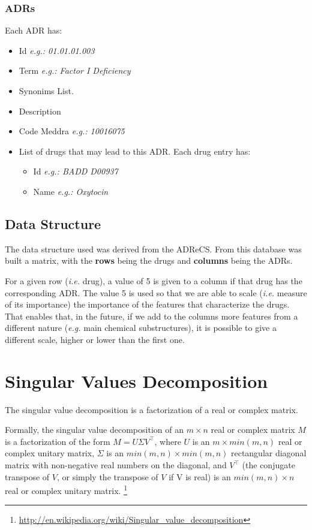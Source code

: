 \documentclass{llncs}
\begin{document}
\subsubsection{ADRs}

Each ADR has:
\begin{itemize}
\item Id \emph{e.g.: 01.01.01.003}
\item Term \emph{e.g.: Factor I Deficiency}
\item Synonims List.
\item Description
\item Code Meddra \emph{e.g.: 10016075}
\item List of drugs that may lead to this ADR. Each drug entry has:
	\begin{itemize}
	\item Id \emph{e.g.: BADD D00937}
	\item Name \emph{e.g.: Oxytocin}
	\end{itemize}
\end{itemize}

\subsection{Data Structure}
The data structure used was derived from the ADReCS. From this database was built a matrix, with the \textbf{rows} being the drugs and \textbf{columns} being the ADRs.

For a given row (\emph{i.e.} drug), a value of 5 is given to a column if that drug has the corresponding ADR. 
The value 5 is used so that we are able to scale (\emph{i.e.} measure of its importance) the importance of the features that characterize the drugs. That enables that, in the future, if we add to the columns more features from a different nature (\emph{e.g.} main chemical substructures), it is possible to give a different scale, higher or lower than the first one.

\section{Singular Values Decomposition}
The singular value decomposition is a factorization of a real or complex matrix.

Formally, the singular value decomposition of an $m \times n$ real or complex matrix $M$ is a factorization of the form $M = U \Sigma V^\top$, where $U$ is an $m \times min(m, n)$ real or complex unitary matrix, $\Sigma$ is an $min(m, n) \times min(m, n)$ rectangular diagonal matrix with non-negative real numbers on the diagonal, and $V^\top$ (the conjugate transpose of $V$, or simply the transpose of $V$ if V is real) is an $min(m, n) \times n$ real or complex unitary matrix.
\footnote{\url{http://en.wikipedia.org/wiki/Singular_value_decomposition}}
\end{document}

